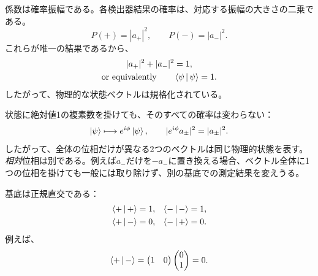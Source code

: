 係数は確率振幅である。各検出器結果の確率は、対応する振幅の大きさの二乗である。
\begin{equation}
  P(+)=|a_+|^2,
  \qquad
  P(-)=|a_-|^2.
  \label{eq:l02-born-rule}
\end{equation}
これらが唯一の結果であるから、
\begin{equation}
  \begin{gathered}
    |a_+|^2+|a_-|^2=1,\\
    \text{or equivalently}\qquad \left\langle\psi\,\middle|\,\psi\right\rangle=1.
  \end{gathered}
  \label{eq:l02-normalization}
\end{equation}
したがって、物理的な状態ベクトルは規格化されている。

\begin{classroomqa}
\end{classroomqa}

状態に絶対値1の複素数を掛けても、そのすべての確率は変わらない：
\begin{equation}
  \left\lvert\psi\right\rangle\longmapsto e^{i\phi}\left\lvert\psi\right\rangle,
  \qquad
  |e^{i\phi}a_\pm|^2=|a_\pm|^2.
  \label{eq:l02-global-phase}
\end{equation}
したがって、全体の位相だけが異なる2つのベクトルは同じ物理的状態を表す。\emph{相対}位相は別である。例えば\(a_-\)だけを\(-a_-\)に置き換える場合、ベクトル全体に1つの位相を掛けても一般には取り除けず、別の基底での測定結果を変えうる。

\begin{classroomqa}
\end{classroomqa}

基底は正規直交である：
\begin{align}
  \left\langle+\,\middle|\,+\right\rangle&=1,
  &\left\langle-\,\middle|\,-\right\rangle&=1,
  \notag\\
  \left\langle+\,\middle|\,-\right\rangle&=0,
  &\left\langle-\,\middle|\,+\right\rangle&=0.
  \label{eq:l02-orthonormality}
\end{align}
例えば、
\begin{equation}
  \left\langle+\,\middle|\,-\right\rangle
  =
  \begin{pmatrix}1&0\end{pmatrix}
  \begin{pmatrix}0\\1\end{pmatrix}
  =0.
\end{equation}

